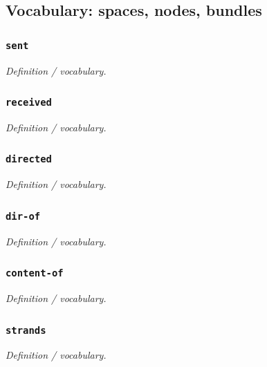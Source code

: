 \documentclass[11pt]{article}
\begin{document}
\subsection{Vocabulary: spaces, nodes, bundles}

\subsubsection*{\texttt{sent}}
\emph{Definition / vocabulary.}

\subsubsection*{\texttt{received}}
\emph{Definition / vocabulary.}

\subsubsection*{\texttt{directed}}
\emph{Definition / vocabulary.}

\subsubsection*{\texttt{dir-of}}
\emph{Definition / vocabulary.}

\subsubsection*{\texttt{content-of}}
\emph{Definition / vocabulary.}

\subsubsection*{\texttt{strands}}
\emph{Definition / vocabulary.}
\end{document}
